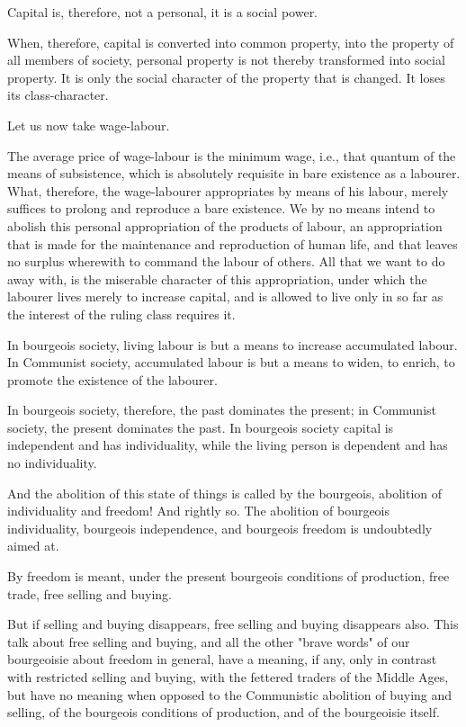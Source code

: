 \documentclass[, oneside]{article}   	%
\begin{document}
Capital is, therefore, not a personal, it is a social power.

When, therefore, capital is converted into common property, into the property of all members of society, personal property is not thereby transformed into social property. It is only the social character of the property that is changed. It loses its class-character.

Let us now take wage-labour.

The average price of wage-labour is the minimum wage, i.e., that quantum of the means of subsistence, which is absolutely requisite in bare existence as a labourer. What, therefore, the wage-labourer appropriates by means of his labour, merely suffices to prolong and reproduce a bare existence. We by no means intend to abolish this personal appropriation of the products of labour, an appropriation that is made for the maintenance and reproduction of human life, and that leaves no surplus wherewith to command the labour of others. All that we want to do away with, is the miserable character of this appropriation, under which the labourer lives merely to increase capital, and is allowed to live only in so far as the interest of the ruling class requires it.

In bourgeois society, living labour is but a means to increase accumulated labour. In Communist society, accumulated labour is but a means to widen, to enrich, to promote the existence of the labourer.

In bourgeois society, therefore, the past dominates the present; in Communist society, the present dominates the past. In bourgeois society capital is independent and has individuality, while the living person is dependent and has no individuality.

And the abolition of this state of things is called by the bourgeois, abolition of individuality and freedom! And rightly so. The abolition of bourgeois individuality, bourgeois independence, and bourgeois freedom is undoubtedly aimed at.

By freedom is meant, under the present bourgeois conditions of production, free trade, free selling and buying.

But if selling and buying disappears, free selling and buying disappears also. This talk about free selling and buying, and all the other "brave words" of our bourgeoisie about freedom in general, have a meaning, if any, only in contrast with restricted selling and buying, with the fettered traders of the Middle Ages, but have no meaning when opposed to the Communistic abolition of buying and selling, of the bourgeois conditions of production, and of the bourgeoisie itself.
\end{document}
